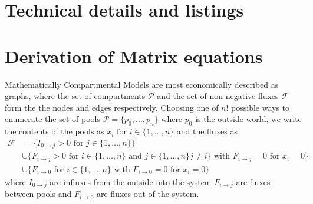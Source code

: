 
%
%
%

\appendix
\section{Technical details and listings}
\label{appendix:listing}

\section{Derivation of Matrix equations}
\label{appendix:MatrixDerivation}
Mathematically Compartmental Models are most economically described as graphs, where the set of compartments $\mathcal{P}$ and the set of non-negative fluxes $\mathcal{F}$ form the the nodes and edges respectively. 
Choosing one of $n!$ possible ways to enumerate  the set of pools $\mathcal{P}=\{p_0,\dots,p_n\}$ where $p_0$ is the outside world, we write the contents of the pools as $x_i \text{ for } i \in \{1,\dots,n\} $ and the fluxes as
\begin{align*}
\mathcal{F} &=
\{
I_{0 \rightarrow j} > 0
\text{ for } j \in \{1,\dots ,n\}
\}  
\\
&
\cup
\{
F_{i \rightarrow j} > 0
\text{ for } i \in \{1,\dots ,n\} 
\text{ and } j \in \{1,\dots ,n\} j\ne i
\}
\text{ with }
F_{i \rightarrow j}=0 \text{ for }  x_{i} = 0 
\}
\\
&
\cup
\{
F_{i \rightarrow 0} 
\text{ for } i \in \{1,\dots ,n\} 
\text{ with }
F_{i \rightarrow 0}=0 \text{ for }  x_{i} = 0 
\}
\end{align*}
\label{massbalance} 
where 
$ 
I_{0 \rightarrow j} 
$
are influxes from the outside into the system 
$
F_{i \rightarrow j} 
$
are fluxes between pools 
and 
$
F_{i \rightarrow 0} 
$
are fluxes out of the system.

